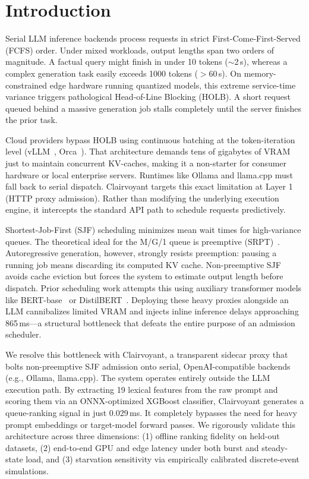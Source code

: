 \documentclass[10pt]{article}
\begin{document}
\section{Introduction}
\label{sec:introduction}

Serial LLM inference backends process requests in strict First-Come-First-Served (FCFS) order. Under mixed workloads, output lengths span two orders of magnitude. A factual query might finish in under 10 tokens ($\sim$2\,s), whereas a complex generation task easily exceeds 1000 tokens ($>$60\,s). On memory-constrained edge hardware running quantized models, this extreme service-time variance triggers pathological Head-of-Line Blocking (HOLB). A short request queued behind a massive generation job stalls completely until the server finishes the prior task.

Cloud providers bypass HOLB using continuous batching at the token-iteration level (vLLM~\cite{kwon2023efficient}, Orca~\cite{yu2022orca}). That architecture demands tens of gigabytes of VRAM just to maintain concurrent KV-caches, making it a non-starter for consumer hardware or local enterprise servers. Runtimes like Ollama and llama.cpp must fall back to serial dispatch. Clairvoyant targets this exact limitation at Layer 1 (HTTP proxy admission). Rather than modifying the underlying execution engine, it intercepts the standard API path to schedule requests predictively.

Shortest-Job-First (SJF) scheduling minimizes mean wait times for high-variance queues. The theoretical ideal for the M/G/1 queue is preemptive (SRPT)~\cite{schrage1968proof}. Autoregressive generation, however, strongly resists preemption: pausing a running job means discarding its computed KV cache. Non-preemptive SJF avoids cache eviction but forces the system to estimate output length before dispatch. Prior scheduling work attempts this using auxiliary transformer models like BERT-base~\cite{qiu2024efficient} or DistilBERT~\cite{jin2023s3}. Deploying these heavy proxies alongside an LLM cannibalizes limited VRAM and injects inline inference delays approaching 865\,ms—a structural bottleneck that defeats the entire purpose of an admission scheduler.

We resolve this bottleneck with Clairvoyant, a transparent sidecar proxy that bolts non-preemptive SJF admission onto serial, OpenAI-compatible backends (e.g., Ollama, llama.cpp). The system operates entirely outside the LLM execution path. By extracting 19 lexical features from the raw prompt and scoring them via an ONNX-optimized XGBoost classifier, Clairvoyant generates a queue-ranking signal in just 0.029\,ms. It completely bypasses the need for heavy prompt embeddings or target-model forward passes. We rigorously validate this architecture across three dimensions: (1) offline ranking fidelity on held-out datasets, (2) end-to-end GPU and edge latency under both burst and steady-state load, and (3) starvation sensitivity via empirically calibrated discrete-event simulations.
\end{document}
